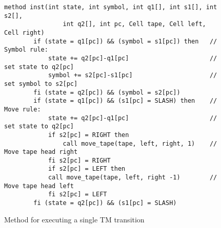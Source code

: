 \begin{figure}[ht]
    \centering
    \begin{lstlisting}[style = basic, language = roopl]
    method inst(int state, int symbol, int q1[], int s1[], int s2[], 
                int q2[], int pc, Cell tape, Cell left, Cell right)
        if (state = q1[pc]) && (symbol = s1[pc]) then   // Symbol rule:
            state += q2[pc]-q1[pc]                      // set state to q2[pc]
            symbol += s2[pc]-s1[pc]                     // set symbol to s2[pc]
        fi (state = q2[pc]) && (symbol = s2[pc])
        if (state = q1[pc]) && (s1[pc] = SLASH) then    // Move rule:
            state += q2[pc]-q1[pc]                      // set state to q2[pc]
            if s2[pc] = RIGHT then
                call move_tape(tape, left, right, 1)    // Move tape head right
            fi s2[pc] = RIGHT
            if s2[pc] = LEFT then
            call move_tape(tape, left, right -1)        // Move tape head left
            fi s2[pc] = LEFT
        fi (state = q2[pc]) && (s1[pc] = SLASH)
    \end{lstlisting}
    \caption{Method for executing a single TM transition}
    \label{fig:rtm-instruction-method}
\end{figure}



